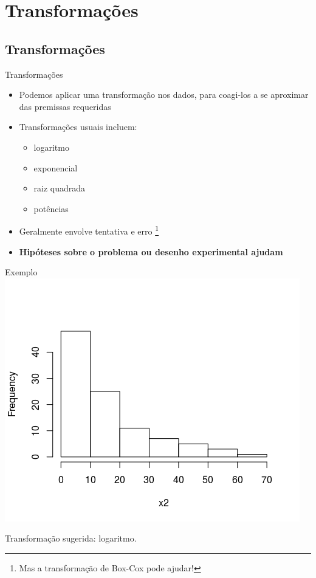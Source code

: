 \documentclass{beamer}
\begin{document}
\section{Transformações}

\subsection{Transformações}

\begin{frame}{Transformações}
  \begin{itemize}
    \small
  \item Podemos aplicar uma transformação nos dados, para coagi-los a se aproximar das premissas requeridas
    \bigskip
  \item Transformações usuais incluem:
    \begin{itemize}
      \footnotesize
    \item logaritmo
    \item exponencial
    \item raiz quadrada
    \item potências
    \end{itemize}
    \bigskip
  \item Geralmente envolve tentativa e erro \footnote{\scriptsize Mas a transformação de Box-Cox pode ajudar!}
    \bigskip
    \footnotesize
  \item {\bf Hipóteses sobre o problema ou desenho experimental ajudam}
  \end{itemize}
\end{frame}


\begin{frame}{Exemplo}
  \centering
  \includegraphics[width=.8\textwidth]{Cap37-38/lognormal1-h}

  \footnotesize
Transformação sugerida: logaritmo.
\end{frame}
\end{document}

